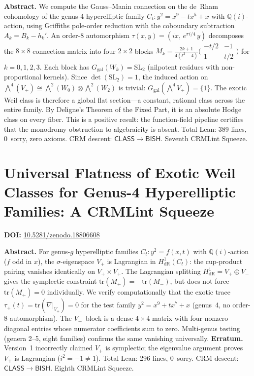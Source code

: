 \documentclass[11pt,a4paper]{article}
\begin{document}
\bigskip
\noindent\textbf{Abstract.}
We compute the Gauss--Manin connection on the de~Rham cohomology of the genus-4 hyperelliptic family $C_t\colon y^2 = x^9 - tx^5 + x$ with $\mathbb{Q}(i)$-action, using Griffiths pole-order reduction with the coboundary subtraction $A_k = B_k - h_k'$. An order-8 automorphism $\tau(x,y) = (ix,\, e^{\pi i/4}\,y)$ decomposes the $8 \times 8$ connection matrix into four $2 \times 2$ blocks $M_k = \frac{2k+1}{4(t^2-4)} \bigl(\begin{smallmatrix} -t/2 & -1 \\ 1 & t/2 \end{smallmatrix}\bigr)$ for $k = 0,1,2,3$. Each block has $G_{\mathrm{gal}}(W_k) = \mathrm{SL}_2$ (nilpotent residues with non-proportional kernels). Since $\det(\mathrm{SL}_2) = 1$, the induced action on $\bigwedge^4(V_+) \cong \bigwedge^2(W_0) \otimes \bigwedge^2(W_2)$ is trivial: $G_{\mathrm{gal}}(\bigwedge^4 V_+) = \{1\}$. The exotic Weil class is therefore a global flat section---a constant, rational class across the entire family. By Deligne's Theorem of the Fixed Part, it is an absolute Hodge class on every fiber. This is a positive result: the function-field pipeline certifies that the monodromy obstruction to algebraicity is absent. Total Lean: 389 lines, 0~sorry, zero axioms. CRM descent: $\mathsf{CLASS} \to \mathsf{BISH}$. Seventh CRMLint Squeeze.

\section{Universal Flatness of Exotic Weil Classes for Genus-4 Hyperelliptic Families: A CRMLint Squeeze}
\label{sec:p85}
\textbf{DOI:} \href{https://doi.org/10.5281/zenodo.18806608}{10.5281/zenodo.18806608}

\bigskip
\noindent\textbf{Abstract.}
For genus-$g$ hyperelliptic families $C_t\colon y^2 = f(x,t)$ with $\mathbb{Q}(i)$-action ($f$ odd in $x$), the $\sigma$-eigenspace $V_+$ is Lagrangian in $H^1_{\mathrm{dR}}(C_t)$: the cup-product pairing vanishes identically on $V_+ \times V_+$. The Lagrangian splitting $H^1_{\mathrm{dR}} = V_+ \oplus V_-$ gives the symplectic constraint $\mathrm{tr}(M_+) = -\mathrm{tr}(M_-)$, but does not force $\mathrm{tr}(M_+) = 0$ individually. We verify computationally that the exotic trace $\tau_+(t) = \mathrm{tr}(\nabla|_{V_+}) = 0$ for the test family $y^2 = x^9 + tx^7 + x$ (genus~4, no order-8 automorphism). The $V_+$~block is a dense $4 \times 4$ matrix with four nonzero diagonal entries whose numerator coefficients sum to zero. Multi-genus testing (genera 2--5, eight families) confirms the same vanishing universally. \textbf{Erratum.} Version~1 incorrectly claimed $V_+$ is symplectic; the eigenvalue argument proves $V_+$ is Lagrangian ($i^2 = -1 \neq 1$). Total Lean: 296 lines, 0~sorry. CRM descent: $\mathsf{CLASS} \to \mathsf{BISH}$. Eighth CRMLint Squeeze.
\end{document}
